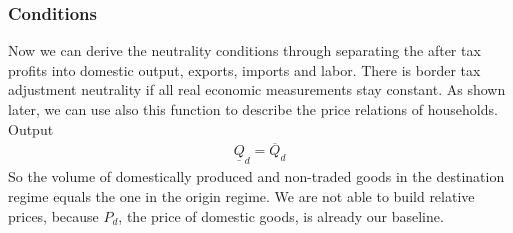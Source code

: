 \subsubsection*{Conditions}
Now we can derive the neutrality conditions through separating the after tax profits into domestic output, exports, imports and labor. There is border tax adjustment neutrality if all real economic measurements stay constant. As shown later, we can use also this function to describe the price relations of households.\\

\noindent Output
\begin{equation}\label{P.Out}
\begin{aligned}
\underline Q_d = \overline Q_d
\end{aligned}
\end{equation}
So the volume of domestically produced and non-traded goods in the destination regime equals the one in the origin regime. We are not able to build relative prices, because $P_d$, the price of domestic goods, is already our baseline.\\

